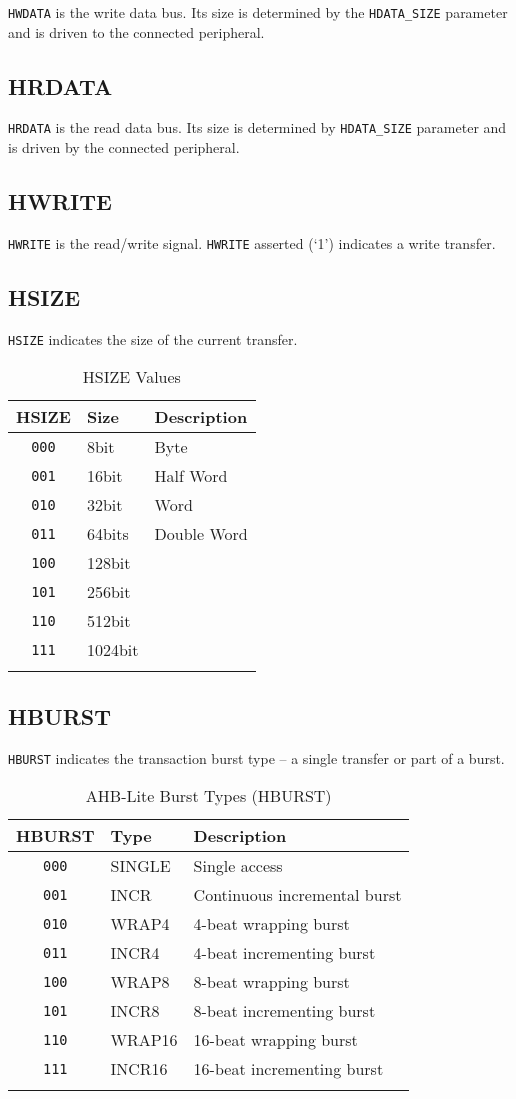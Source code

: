 \texttt{HWDATA} is the write data bus. Its size is determined by the \texttt{HDATA\_SIZE}
parameter and is driven to the connected peripheral.

\subsection{HRDATA}\label{hrdata}

\texttt{HRDATA} is the read data bus. Its size is determined by \texttt{HDATA\_SIZE}
parameter and is driven by the connected peripheral.

\subsection{HWRITE}\label{hwrite}

\texttt{HWRITE} is the read/write signal. \texttt{HWRITE} asserted (`1') indicates a write
transfer.

\subsection{HSIZE}\label{hsize}

\texttt{HSIZE} indicates the size of the current transfer.

\begin{longtable}[]{@{}cll@{}}
	\toprule
	HSIZE & Size & Description\tabularnewline
	\midrule
	\endhead
	\texttt{000} & 8bit & Byte\tabularnewline
	\texttt{001} & 16bit & Half Word\tabularnewline
	\texttt{010} & 32bit & Word\tabularnewline
	\texttt{011} & 64bits & Double Word\tabularnewline
	\texttt{100} & 128bit &\tabularnewline
	\texttt{101} & 256bit &\tabularnewline
	\texttt{110} & 512bit &\tabularnewline
	\texttt{111} & 1024bit &\tabularnewline
	\bottomrule
	\caption{HSIZE Values}
\end{longtable}

\subsection{HBURST}\label{hburst}

\texttt{HBURST} indicates the transaction burst type -- a single transfer or part
of a burst.

\begin{longtable}[]{@{}cll@{}}
	\toprule
		HBURST & Type & Description\tabularnewline
	\midrule
	\endhead
		\texttt{000} & SINGLE & Single access\tabularnewline
		\texttt{001} & INCR   & Continuous incremental burst\tabularnewline
		\texttt{010} & WRAP4  & 4-beat wrapping burst\tabularnewline
		\texttt{011} & INCR4  & 4-beat incrementing burst\tabularnewline
		\texttt{100} & WRAP8  & 8-beat wrapping burst\tabularnewline
		\texttt{101} & INCR8  & 8-beat incrementing burst\tabularnewline
		\texttt{110} & WRAP16 & 16-beat wrapping burst\tabularnewline
		\texttt{111} & INCR16 & 16-beat incrementing burst\tabularnewline
	\bottomrule
	\caption{AHB-Lite Burst Types (HBURST)}
\end{longtable}

